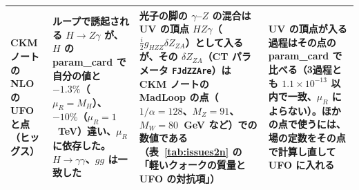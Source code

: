 \documentclass[a4paper,10pt]{ltjsarticle}
\begin{document}
\begin{table}[tbp]
\begin{tabularx}{\linewidth}{>{\raggedright\arraybackslash}p{2.4cm}>{\raggedright\arraybackslash}X>{\raggedright\arraybackslash}X>{\raggedright\arraybackslash}X}
CKM ノートの NLO の UFO と点（ヒッグス） & ループで誘起される $H\to Z\gamma$ が、$H$ の param\_card で自分の値と $-1.3\%$（$\mu_R=M_H$）、$-10\%$（$\mu_R=1$~TeV）違い、$\mu_R$ に依存した。$H\to\gamma\gamma$、$gg$ は一致した & 光子の脚の $\gamma$--$Z$ の混合は UV の頂点 $HZ\gamma$（$\frac i2g_{HZZ}\delta Z_{ZA}$）として入るが、その $\delta Z_{ZA}$（CT パラメータ \texttt{FJdZZAre}）は CKM ノートの MadLoop の点（$1/\alpha=128$、$M_Z=91$、$M_W=80$~GeV など）での数値である（表~\ref{tab:issues2n} の「軽いクォークの質量と UFO の対抗項」） & UV の頂点が入る過程はその点の param\_card で比べる（3過程とも $1.1\times10^{-13}$ 以内で一致、$\mu_R$ によらない）。ほかの点で使うには、場の定数をその点で計算し直して UFO に入れる \\
\bottomrule
\end{tabularx}
\end{table}
\end{document}
